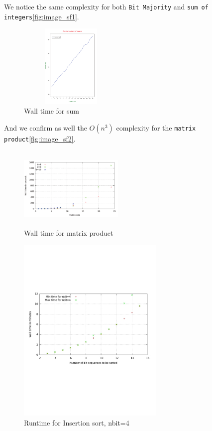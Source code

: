 \documentclass{acm_proc_article-sp}
\begin{document}
We notice the same complexity for both \texttt{Bit Majority} and \texttt{sum of integers}\autoref{fig:image_sf1}.
\begin{figure}[!H]%
\centering
\includegraphics[width=5cm, height=4cm]{f8.pdf} 
\caption{Wall time for sum} 
\label{fig:image_sf1} %
\end{figure}

And we confirm as well the $O(n^{3})$ complexity for the \texttt{matrix product}\autoref{fig:image_sf2}.
\begin{figure}[!H]%
\centering
\includegraphics[width=5cm, height=4cm]{f9.pdf} 
\caption{Wall time for matrix product} 
\label{fig:image_sf2} %
\end{figure}

\begin{figure}[!h]
\centering
\includegraphics[width=7cm]{fsort3.pdf} 
\caption{Runtime for Insertion sort, nbit=4} 
\label{fig:image_sf3} %
\end{figure}
\end{document}
